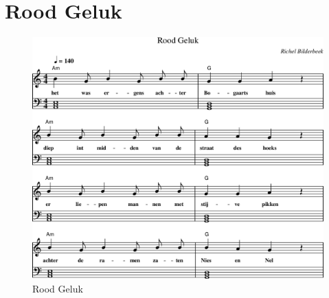\chapter{Rood Geluk}



\begin{figure}[!htbp]
  \includegraphics[width=\textwidth,height=\textheight,keepaspectratio]{../songs/11_rood_geluk.png}
  \caption{Rood Geluk}
  \label{fig:11_rood_geluk}
\end{figure}
